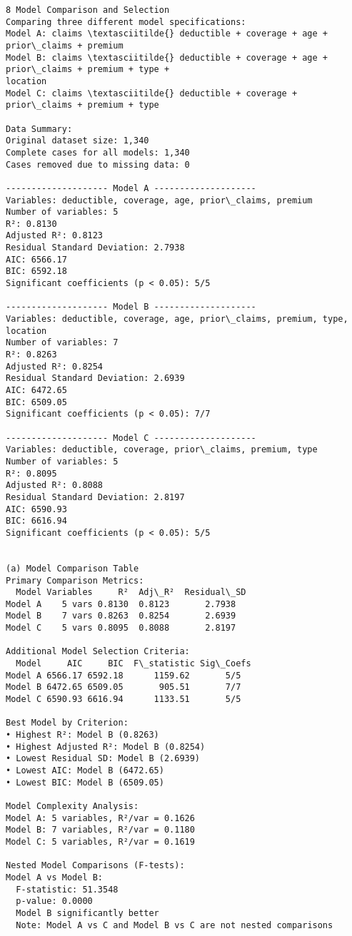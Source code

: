 \documentclass[8pt, twocolumn]{extarticle}
\begin{document}
    \begin{Verbatim}[commandchars=\\\{\}]
8 Model Comparison and Selection
Comparing three different model specifications:
Model A: claims \textasciitilde{} deductible + coverage + age + prior\_claims + premium
Model B: claims \textasciitilde{} deductible + coverage + age + prior\_claims + premium + type +
location
Model C: claims \textasciitilde{} deductible + coverage + prior\_claims + premium + type

Data Summary:
Original dataset size: 1,340
Complete cases for all models: 1,340
Cases removed due to missing data: 0

-------------------- Model A --------------------
Variables: deductible, coverage, age, prior\_claims, premium
Number of variables: 5
R²: 0.8130
Adjusted R²: 0.8123
Residual Standard Deviation: 2.7938
AIC: 6566.17
BIC: 6592.18
Significant coefficients (p < 0.05): 5/5

-------------------- Model B --------------------
Variables: deductible, coverage, age, prior\_claims, premium, type, location
Number of variables: 7
R²: 0.8263
Adjusted R²: 0.8254
Residual Standard Deviation: 2.6939
AIC: 6472.65
BIC: 6509.05
Significant coefficients (p < 0.05): 7/7

-------------------- Model C --------------------
Variables: deductible, coverage, prior\_claims, premium, type
Number of variables: 5
R²: 0.8095
Adjusted R²: 0.8088
Residual Standard Deviation: 2.8197
AIC: 6590.93
BIC: 6616.94
Significant coefficients (p < 0.05): 5/5


(a) Model Comparison Table
Primary Comparison Metrics:
  Model Variables     R²  Adj\_R²  Residual\_SD
Model A    5 vars 0.8130  0.8123       2.7938
Model B    7 vars 0.8263  0.8254       2.6939
Model C    5 vars 0.8095  0.8088       2.8197

Additional Model Selection Criteria:
  Model     AIC     BIC  F\_statistic Sig\_Coefs
Model A 6566.17 6592.18      1159.62       5/5
Model B 6472.65 6509.05       905.51       7/7
Model C 6590.93 6616.94      1133.51       5/5

Best Model by Criterion:
• Highest R²: Model B (0.8263)
• Highest Adjusted R²: Model B (0.8254)
• Lowest Residual SD: Model B (2.6939)
• Lowest AIC: Model B (6472.65)
• Lowest BIC: Model B (6509.05)

Model Complexity Analysis:
Model A: 5 variables, R²/var = 0.1626
Model B: 7 variables, R²/var = 0.1180
Model C: 5 variables, R²/var = 0.1619

Nested Model Comparisons (F-tests):
Model A vs Model B:
  F-statistic: 51.3548
  p-value: 0.0000
  Model B significantly better
  Note: Model A vs C and Model B vs C are not nested comparisons
    \end{Verbatim}
\end{document}

